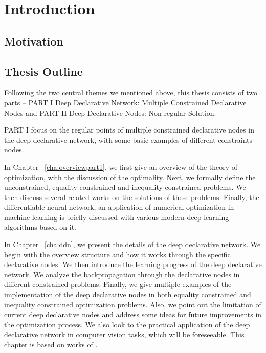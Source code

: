 \chapter{Introduction}
\label{cha:intro}

\section{Motivation}
\label{sec:motivation}




\section{Thesis Outline}
\label{sec:outline}
Following the two central themes we mentioned above, this thesis consists of two parts -- PART I Deep Declarative Network: Multiple Constrained Declarative Nodes and PART II Deep Declarative Nodes: Non-regular Solution. 
\par PART I focus on the regular points of multiple constrained declarative nodes in the deep declarative network, with some basic examples of different constraints nodes. 
\begin{description}
    \item In Chapter ~\ref{cha:overviewpart1}, we first give an overview of the theory of optimization, with the discussion of the optimality. Next, we formally define the unconstrained, equality constrained and inequality constrained problems. We then discuss several related works on the solutions of these problems. Finally, the differentiable neural network, an application of numerical optimization in machine learning is briefly discussed with various modern deep learning algorithms based on it. 
    \item In Chapter ~\ref{cha:ddn}, we present the details of the deep declarative network. We begin with the overview structure and how it works through the specific declarative nodes. We then introduce the learning progress of the deep declarative network. We analyze the backpropagation through the declarative nodes in different constrained problems. Finally, we give multiple examples of the implementation of the deep declarative nodes in both equality constrained and inequality constrained optimization problems. Also, we point out the limitation of current deep declarative nodes and address some ideas for future improvements in the optimization process. We also look to the practical application of the deep declarative network in computer vision tasks, which will be foreseeable. This chapter is based on works of \cite{SG:19}. 
\end{description}

